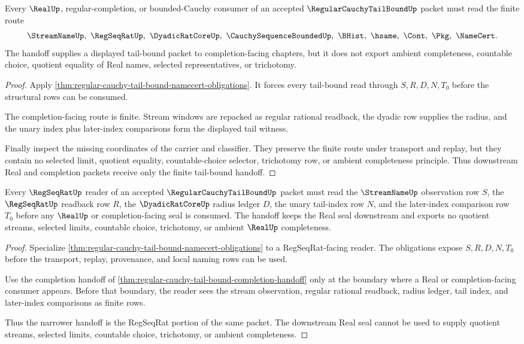 \begin{theorem}
\label{thm:regular-cauchy-tail-bound-completion-handoff}
Every $\RealUp$, regular-completion, or bounded-Cauchy consumer of an accepted $\RegularCauchyTailBoundUp$ packet must read the finite route
$$
\StreamNameUp,\ \RegSeqRatUp,\ \DyadicRatCoreUp,\ \CauchySequenceBoundedUp,\ \BHist,\ \hsame,\ \Cont,\ \Pkg,\ \NameCert .
$$
The handoff supplies a displayed tail-bound packet to completion-facing chapters, but it does not export ambient completeness, countable choice, quotient equality of Real names, selected representatives, or trichotomy.
\end{theorem}
\begin{proof}
Apply \autoref{thm:regular-cauchy-tail-bound-namecert-obligations}. It forces every tail-bound read through $S,R,D,N,T_0$ before the structural rows can be consumed.

The completion-facing route is finite. Stream windows are repacked as regular rational readback, the dyadic row supplies the radius, and the unary index plus later-index comparisons form the displayed tail witness.

Finally inspect the missing coordinates of the carrier and classifier. They preserve the finite route under transport and replay, but they contain no selected limit, quotient equality, countable-choice selector, trichotomy row, or ambient completeness principle. Thus downstream Real and completion packets receive only the finite tail-bound handoff.
\end{proof}

\begin{theorem}
\label{thm:regular-cauchy-tail-bound-regseqrat-handoff}
Every $\RegSeqRatUp$ reader of an accepted $\RegularCauchyTailBoundUp$ packet must read the $\StreamNameUp$ observation row $S$, the $\RegSeqRatUp$ readback row $R$, the $\DyadicRatCoreUp$ radius ledger $D$, the unary tail-index row $N$, and the later-index comparison row $T_0$ before any $\RealUp$ or completion-facing seal is consumed. The handoff keeps the Real seal downstream and exports no quotient streams, selected limits, countable choice, trichotomy, or ambient $\RealUp$ completeness.
\end{theorem}
\begin{proof}
Specialize \autoref{thm:regular-cauchy-tail-bound-namecert-obligations} to a RegSeqRat-facing reader. The obligations expose $S,R,D,N,T_0$ before the transport, replay, provenance, and local naming rows can be used.

Use the completion handoff of \autoref{thm:regular-cauchy-tail-bound-completion-handoff} only at the boundary where a Real or completion-facing consumer appears. Before that boundary, the reader sees the stream observation, regular rational readback, radius ledger, tail index, and later-index comparisons as finite rows.

Thus the narrower handoff is the RegSeqRat portion of the same packet. The downstream Real seal cannot be used to supply quotient streams, selected limits, countable choice, trichotomy, or ambient completeness.
\end{proof}


